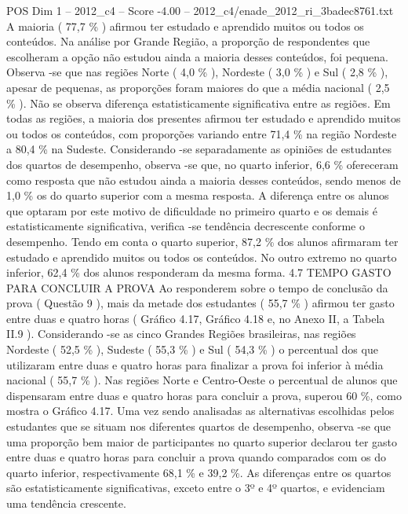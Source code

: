 \begin{textsample}{POS Dim 1 – 2012\_c4 – Score -4.00 – 2012\_c4/enade\_2012\_ri\_3badec8761.txt}
A maioria ( 77,7 \% ) afirmou ter estudado e aprendido muitos ou todos os conteúdos.
Na análise por Grande Região, a proporção de respondentes que escolheram a opção não estudou ainda a maioria desses conteúdos, foi pequena.
Observa -se que nas regiões Norte ( 4,0 \% ), Nordeste ( 3,0 \% ) e Sul ( 2,8 \% ), apesar de pequenas, as proporções foram maiores do que a média nacional ( 2,5 \% ).
Não se observa diferença estatisticamente significativa entre as regiões.
Em todas as regiões, a maioria dos presentes afirmou ter estudado e aprendido muitos ou todos os conteúdos, com proporções variando entre 71,4 \% na região Nordeste a 80,4 \% na Sudeste.
Considerando -se separadamente as opiniões de estudantes dos quartos de desempenho, observa -se que, no quarto inferior, 6,6 \% ofereceram como resposta que não estudou ainda a maioria desses conteúdos, sendo menos de 1,0 \% os do quarto superior com a mesma resposta.
A diferença entre os alunos que optaram por este motivo de dificuldade no primeiro quarto e os demais é estatisticamente significativa, verifica -se tendência decrescente conforme o desempenho.
Tendo em conta o quarto superior, 87,2 \% dos alunos afirmaram ter estudado e aprendido muitos ou todos os conteúdos.
No outro extremo no quarto inferior, 62,4 \% dos alunos responderam da mesma forma. 4.7 TEMPO GASTO PARA CONCLUIR A PROVA Ao responderem sobre o tempo de conclusão da prova ( Questão 9 ), mais da metade dos estudantes ( 55,7 \% ) afirmou ter gasto entre duas e quatro horas ( Gráfico 4.17, Gráfico 4.18 e, no Anexo II, a Tabela II.9 ).
Considerando -se as cinco Grandes Regiões brasileiras, nas regiões Nordeste ( 52,5 \% ), Sudeste ( 55,3 \% ) e Sul ( 54,3 \% ) o percentual dos que utilizaram entre duas e quatro horas para finalizar a prova foi inferior à média nacional ( 55,7 \% ).
Nas regiões Norte e Centro-Oeste o percentual de alunos que dispensaram entre duas e quatro horas para concluir a prova, superou 60 \%, como mostra o Gráfico 4.17.
Uma vez sendo analisadas as alternativas escolhidas pelos estudantes que se situam nos diferentes quartos de desempenho, observa -se que uma proporção bem maior de participantes no quarto superior declarou ter gasto entre duas e quatro horas para concluir a prova quando comparados com os do quarto inferior, respectivamente 68,1 \% e 39,2 \%.
As diferenças entre os quartos são estatisticamente significativas, exceto entre o 3º e 4º quartos, e evidenciam uma tendência crescente.

\end{textsample}
